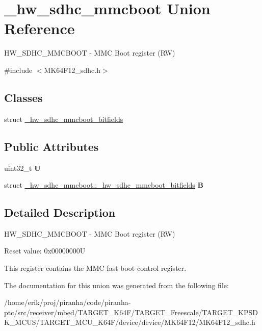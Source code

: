\hypertarget{union__hw__sdhc__mmcboot}{}\section{\+\_\+hw\+\_\+sdhc\+\_\+mmcboot Union Reference}
\label{union__hw__sdhc__mmcboot}


H\+W\+\_\+\+S\+D\+H\+C\+\_\+\+M\+M\+C\+B\+O\+OT -\/ M\+MC Boot register (RW)  




{\ttfamily \#include $<$M\+K64\+F12\+\_\+sdhc.\+h$>$}

\subsection*{Classes}
\begin{DoxyCompactItemize}
\item 
struct \hyperlink{struct__hw__sdhc__mmcboot_1_1__hw__sdhc__mmcboot__bitfields}{\+\_\+hw\+\_\+sdhc\+\_\+mmcboot\+\_\+bitfields}
\end{DoxyCompactItemize}
\subsection*{Public Attributes}
\begin{DoxyCompactItemize}
\item 
uint32\+\_\+t {\bfseries U}\hypertarget{union__hw__sdhc__mmcboot_a0001df5a29e4e0a20cd3b44230777405}{}\label{union__hw__sdhc__mmcboot_a0001df5a29e4e0a20cd3b44230777405}

\item 
struct \hyperlink{struct__hw__sdhc__mmcboot_1_1__hw__sdhc__mmcboot__bitfields}{\+\_\+hw\+\_\+sdhc\+\_\+mmcboot\+::\+\_\+hw\+\_\+sdhc\+\_\+mmcboot\+\_\+bitfields} {\bfseries B}\hypertarget{union__hw__sdhc__mmcboot_a691769fa90e6f5b4fc2f6960e5eb1ee9}{}\label{union__hw__sdhc__mmcboot_a691769fa90e6f5b4fc2f6960e5eb1ee9}

\end{DoxyCompactItemize}


\subsection{Detailed Description}
H\+W\+\_\+\+S\+D\+H\+C\+\_\+\+M\+M\+C\+B\+O\+OT -\/ M\+MC Boot register (RW) 

Reset value\+: 0x00000000U

This register contains the M\+MC fast boot control register. 

The documentation for this union was generated from the following file\+:\begin{DoxyCompactItemize}
\item 
/home/erik/proj/piranha/code/piranha-\/ptc/src/receiver/mbed/\+T\+A\+R\+G\+E\+T\+\_\+\+K64\+F/\+T\+A\+R\+G\+E\+T\+\_\+\+Freescale/\+T\+A\+R\+G\+E\+T\+\_\+\+K\+P\+S\+D\+K\+\_\+\+M\+C\+U\+S/\+T\+A\+R\+G\+E\+T\+\_\+\+M\+C\+U\+\_\+\+K64\+F/device/device/\+M\+K64\+F12/M\+K64\+F12\+\_\+sdhc.\+h\end{DoxyCompactItemize}
